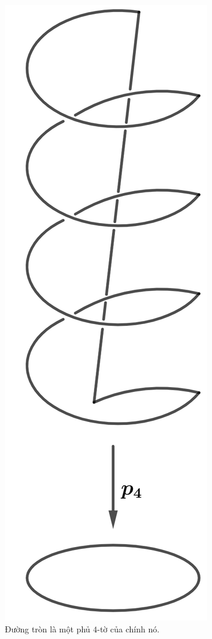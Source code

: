\documentclass[12pt]{article}
\begin{document}
\begin{figure}[h!]
    \centering
    \includegraphics[scale = .2]{h7.png}
    \caption{Đường tròn là một phủ $4$-tờ của chính nó.}
    \label{h7}
\end{figure}
\end{document}
